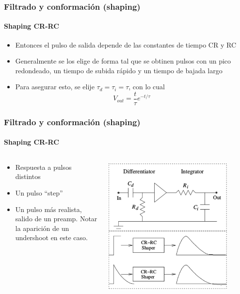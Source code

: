\documentclass{beamer}
\begin{document}
\begin{frame}
\frametitle{Filtrado y conformación (shaping)}
\framesubtitle{{\color{blue}Shaping CR-RC}}
\begin{itemize}
\item Entonces el pulso de salida depende de las constantes de tiempo CR y RC
\item Generalmente se los elige de forma tal que se obtinen pulsos con un pico
redondeado, un tiempo de subida rápido y un tiempo de bajada largo
\item Para asegurar esto, se elije $\tau_d = \tau_i = \tau$, con lo cual
$$V_{out} = \frac{t}{\tau}e^{-t/\tau} $$
\end{itemize}
\end{frame}

\begin{frame}
\frametitle{Filtrado y conformación (shaping)}
\framesubtitle{{\color{blue}Shaping CR-RC}}
\begin{columns}
\begin{column}{0.5\textwidth}
\begin{itemize}
\item Respuesta a pulsos distintos 
\item Un pulso ``step''
\item Un pulso más realista, salido de un preamp. Notar la aparición de un
undershoot en este caso.
\end{itemize}
\end{column}
\begin{column}{0.5\textwidth}
\begin{center}
\includegraphics[width=0.85\textwidth]{d2/cr_rc_shaping_amp}
\end{center}
\end{column}
\end{columns}
\end{frame}
\end{document}
